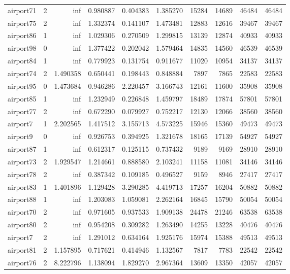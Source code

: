 \begin{longtable}{|l|r|r|r|r|r|r|r|r|r|}
airport71 & 2 & inf & 0.980887 & 0.404383 & 1.385270 & 15284 & 14689 & 46484 & 46484 \\
airport75 & 2 & inf & 1.332374 & 0.141107 & 1.473481 & 12883 & 12616 & 39467 & 39467 \\
airport86 & 1 & inf & 1.029306 & 0.270509 & 1.299815 & 13139 & 12874 & 40933 & 40933 \\
airport98 & 0 & inf & 1.377422 & 0.202042 & 1.579464 & 14835 & 14560 & 46539 & 46539 \\
airport84 & 1 & inf & 0.779923 & 0.131754 & 0.911677 & 11020 & 10954 & 34137 & 34137 \\
airport74 & 2 & 1.490358 & 0.650441 & 0.198443 & 0.848884 & 7897 & 7865 & 22583 & 22583 \\
airport95 & 0 & 1.473684 & 0.946286 & 2.220457 & 3.166743 & 12161 & 11600 & 35908 & 35908 \\
airport85 & 1 & inf & 1.232949 & 0.226848 & 1.459797 & 18489 & 17874 & 57801 & 57801 \\
airport77 & 2 & inf & 0.672290 & 0.079927 & 0.752217 & 12130 & 12066 & 38560 & 38560 \\
airport7 & 1 & 2.202565 & 1.417512 & 3.155713 & 4.573225 & 15946 & 15360 & 49473 & 49473 \\
airport9 & 0 & inf & 0.926753 & 0.394925 & 1.321678 & 18165 & 17139 & 54927 & 54927 \\
airport87 & 1 & inf & 0.612317 & 0.125115 & 0.737432 & 9189 & 9169 & 28910 & 28910 \\
airport73 & 2 & 1.929547 & 1.214661 & 0.888580 & 2.103241 & 11158 & 11081 & 34146 & 34146 \\
airport78 & 2 & inf & 0.387342 & 0.109185 & 0.496527 & 9159 & 8946 & 27417 & 27417 \\
airport83 & 1 & 1.401896 & 1.129428 & 3.290285 & 4.419713 & 17257 & 16204 & 50882 & 50882 \\
airport88 & 1 & inf & 1.203083 & 1.059081 & 2.262164 & 16845 & 15790 & 50054 & 50054 \\
airport70 & 2 & inf & 0.971605 & 0.937533 & 1.909138 & 24478 & 21246 & 63538 & 63538 \\
airport80 & 2 & inf & 0.954208 & 0.309282 & 1.263490 & 14255 & 13228 & 40476 & 40476 \\
airport7 & 2 & inf & 1.291012 & 0.634164 & 1.925176 & 15974 & 15388 & 49513 & 49513 \\
airport81 & 2 & 1.157895 & 0.717621 & 0.414946 & 1.132567 & 7817 & 7783 & 22542 & 22542 \\
airport76 & 2 & 8.222796 & 1.138094 & 1.829270 & 2.967364 & 13609 & 13350 & 42057 & 42057 \\

\end{longtable}
